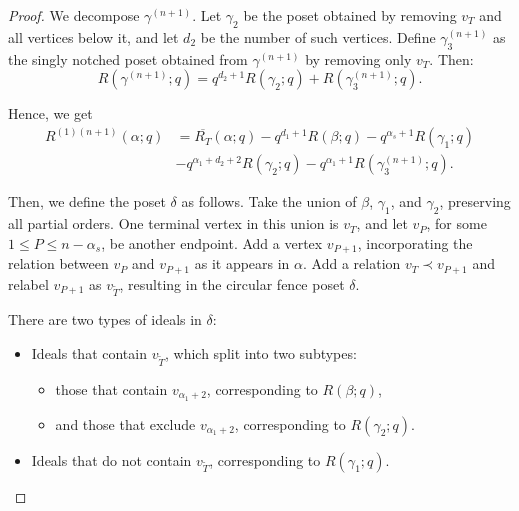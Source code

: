\documentclass{article}
\theoremstyle{remark}
\begin{document}
\begin{proof}
We decompose \( \gamma^{(n+1)} \). Let \( \gamma_2 \) be the poset obtained by removing \( v_T \) and all vertices below it, and let \( d_2 \) be the number of such vertices. Define \( \gamma_3^{(n+1)} \) as the singly notched poset obtained from \( \gamma^{(n+1)} \) by removing only \( v_T \). Then:
\[
R(\gamma^{(n+1)}; q) = q^{d_2 + 1} R(\gamma_2; q) + R(\gamma_3^{(n+1)}; q).
\]

Hence, we get
\begin{eqnarray*}
    R^{(1)(n+1)}(\alpha; q) &= \overline{R_T}(\alpha; q) - q^{d_1 + 1} R(\beta; q) - q^{\alpha_s+1}R(\gamma_1;q)\\
    &- q^{\alpha_1+d_2 + 2}  R(\gamma_2; q) - q^{\alpha_1+1}R(\gamma_3^{(n+1)}; q).
\end{eqnarray*}


Then, we define the poset \( \delta \) as follows. Take the union of \( \beta \), \( \gamma_1 \), and \( \gamma_2 \), preserving all partial orders. One terminal vertex in this union is \( v_T \), and let \( v_P \), for some \( 1 \leq P \leq n - \alpha_s \), be another endpoint. Add a vertex \( v_{P+1} \), incorporating the relation between \( v_P \) and \( v_{P+1} \) as it appears in \( \alpha \). Add a relation \( v_{T} \prec v_{P+1} \) and relabel \(v_{P+1}\) as \( v_{\tilde{T}} \), resulting in the circular fence poset \( \delta \).

There are two types of ideals in \( \delta \):
\begin{itemize}
    \item Ideals that contain \( v_{\tilde{T}} \), which split into two subtypes:
        \begin{itemize}
            \item those that contain \( v_{\alpha_1 + 2} \), corresponding to \( R(\beta; q) \),
            \item and those that exclude \( v_{\alpha_1 + 2} \), corresponding to \( R(\gamma_2; q) \).
        \end{itemize}
    \item Ideals that do not contain \( v_{\tilde{T}} \), corresponding to \( R(\gamma_1; q) \).
\end{itemize}

\begin{figure}[H]
    \centering
\end{figure}
\end{proof}
\end{document}
